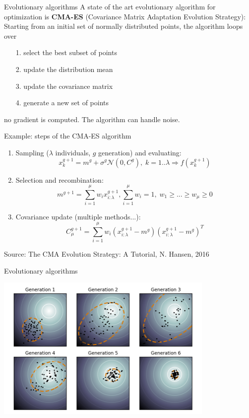 \documentclass{beamer}
\begin{document}
\begin{frame}{Evolutionary algorithms}
A state of the art evolutionary algorithm for optimization is \textbf{CMA-ES} (Covariance Matrix Adaptation Evolution Strategy): \\
\vspace{3mm}
Starting from an initial set of normally distributed points, the algorithm loops over
\begin{itemize}
	\item[1.] select the best subset of points
	\item[2.] update the distribution mean
	\item[3.] update the covariance matrix
	\item[4.] generate a new set of points
\end{itemize}
\vspace{5mm}
 no gradient is computed. The algorithm can handle noise.\\
\end{frame}

\begin{frame}{Example: steps of the CMA-ES algorithm}
\begin{enumerate}
	\item Sampling ($\lambda$ individuals, $g$ generation) and evaluating:
	\[
	x_k^{g+1}=m^g+\sigma^g\mathcal{N}(0,C^g),\;k=1..\lambda\Rightarrow f(x_k^{g+1})
	\]
	\item Selection and recombination:
	\[
	m^{g+1}=\sum_{i=1}^\mu{w_ix_{i:\lambda}^{g+1}},\sum_{i=1}^\mu{w_i}=1,\;w_1\geq...\geq w_\mu\geq 0
	\]
	\item Covariance update (multiple methods...):
	\[
	C_\mu^{g+1}=\sum_{i=1}^\mu{w_i(x_{i:\lambda}^{g+1}-m^g)(x_{i:\lambda}^{g+1}-m^g)^T}
	\]
\end{enumerate}
\small Source: The CMA Evolution Strategy: A Tutorial, N. Hansen, 2016 
\end{frame}

\begin{frame}{Evolutionary algorithms}
\begin{example}
\begin{center}
\includegraphics[height=7cm]{figures/CMAES}
\end{center}	
\end{example}
\end{frame}
\end{document}
